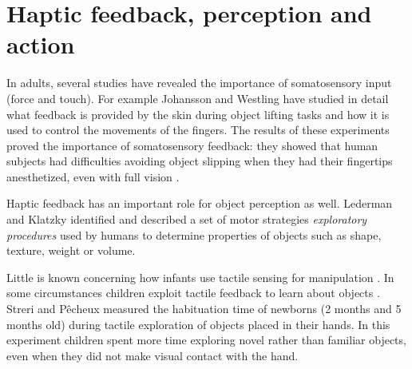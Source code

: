 \section{Haptic feedback, perception and action}
\label{sec:background}

In adults, several studies have revealed the importance of
somatosensory input (force and touch). For example Johansson and Westling
\cite{Johansson90Tactile} have studied in detail what feedback
is provided by the skin during object lifting tasks and how it is
used to control the movements of the fingers. The results of these
experiments proved the importance of somatosensory feedback: they
showed that human subjects had difficulties avoiding object slipping when
they had their fingertips anesthetized, even with full vision
\cite{johansson91how}. 

Haptic feedback has an important role for
object perception as well. Lederman and Klatzky \cite{klatzky87Hand}
identified and described a set of motor strategies
\emph{exploratory procedures} used by humans to determine properties
of objects such as shape, texture, weight or volume.

Little is known concerning how infants use 
tactile sensing for manipulation \cite{streri93Seeing}.
In some circumstances children exploit tactile feedback to learn
about objects \cite{streri86Habituation}. Streri and P\^{e}cheux
measured the habituation time of newborns (2 months and 5 months
old) during tactile exploration of objects placed in their hands.
In this experiment children spent more time exploring novel rather
than familiar objects, even when they did not make visual contact
with the hand. %

